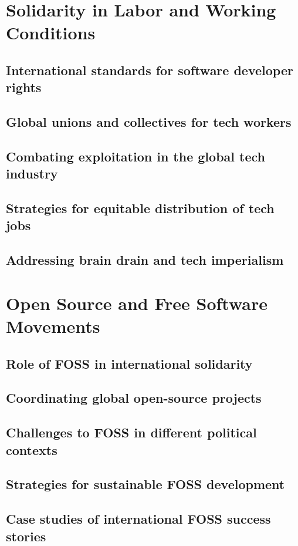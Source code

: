 \newpage

\section{Solidarity in Labor and Working Conditions}
\subsection{International standards for software developer rights}
\subsection{Global unions and collectives for tech workers}
\subsection{Combating exploitation in the global tech industry}
\subsection{Strategies for equitable distribution of tech jobs}
\subsection{Addressing brain drain and tech imperialism}

\newpage

\section{Open Source and Free Software Movements}
\subsection{Role of FOSS in international solidarity}
\subsection{Coordinating global open-source projects}
\subsection{Challenges to FOSS in different political contexts}
\subsection{Strategies for sustainable FOSS development}
\subsection{Case studies of international FOSS success stories}

